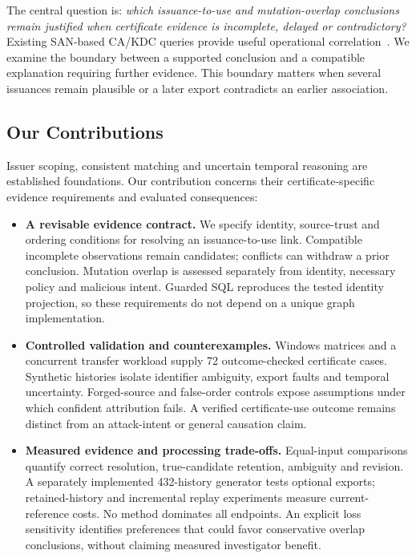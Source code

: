 The central question is: \emph{which issuance-to-use and mutation-overlap conclusions remain justified when certificate evidence is incomplete, delayed or contradictory?} Existing SAN-based CA/KDC queries provide useful operational correlation~\cite{insecurity2023adcs,splunk2026esc1}. We examine the boundary between a supported conclusion and a compatible explanation requiring further evidence. This boundary matters when several issuances remain plausible or a later export contradicts an earlier association.

\subsection{Our Contributions}
Issuer scoping, consistent matching and uncertain temporal reasoning are established foundations. Our contribution concerns their certificate-specific evidence requirements and evaluated consequences:
\begin{itemize}
\item \textbf{A revisable evidence contract.} We specify identity, source-trust and ordering conditions for resolving an issuance-to-use link. Compatible incomplete observations remain candidates; conflicts can withdraw a prior conclusion. Mutation overlap is assessed separately from identity, necessary policy and malicious intent. Guarded SQL reproduces the tested identity projection, so these requirements do not depend on a unique graph implementation.
\item \textbf{Controlled validation and counterexamples.} Windows matrices and a concurrent transfer workload supply 72 outcome-checked certificate cases. Synthetic histories isolate identifier ambiguity, export faults and temporal uncertainty. Forged-source and false-order controls expose assumptions under which confident attribution fails. A verified certificate-use outcome remains distinct from an attack-intent or general causation claim.
\item \textbf{Measured evidence and processing trade-offs.} Equal-input comparisons quantify correct resolution, true-candidate retention, ambiguity and revision. A separately implemented 432-history generator tests optional exports; retained-history and incremental replay experiments measure current-reference costs. No method dominates all endpoints. An explicit loss sensitivity identifies preferences that could favor conservative overlap conclusions, without claiming measured investigator benefit.
\end{itemize}

